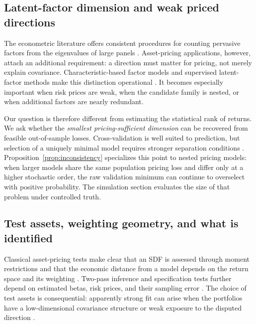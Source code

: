 \subsection{Latent-factor dimension and weak priced directions}

The econometric literature offers consistent procedures for counting pervasive factors from the eigenvalues of large panels \citep{bai2002factors,onatski2010factors,ahn2013eigenvalue}. Asset-pricing applications, however, attach an additional requirement: a direction must matter for pricing, not merely explain covariance. Characteristic-based factor models and supervised latent-factor methods make this distinction operational \citep{kelly2019characteristics,lettau2020factors}. It becomes especially important when risk prices are weak, when the candidate family is nested, or when additional factors are nearly redundant.

Our question is therefore different from estimating the statistical rank of returns. We ask whether the \emph{smallest pricing-sufficient dimension} can be recovered from feasible out-of-sample losses. Cross-validation is well suited to prediction, but selection of a uniquely minimal model requires stronger separation conditions \citep{shao1993cv,yang2007cv,arlot2010cv}. Proposition~\ref{prop:inconsistency} specializes this point to nested pricing models: when larger models share the same population pricing loss and differ only at a higher stochastic order, the raw validation minimum can continue to overselect with positive probability. The simulation section evaluates the size of that problem under controlled truth.

\subsection{Test assets, weighting geometry, and what is identified}

Classical asset-pricing tests make clear that an SDF is assessed through moment restrictions and that the economic distance from a model depends on the return space and its weighting \citep{hansen1991implications,hansen1997assessing,gibbons1989test,shanken1992beta}. Two-pass inference and specification tests further depend on estimated betas, risk prices, and their sampling error \citep{fama1992cross,jagannathan1996conditional,kan2013pricing}. The choice of test assets is consequential: apparently strong fit can arise when the portfolios have a low-dimensional covariance structure or weak exposure to the disputed direction \citep{lewellen2010skeptical}.

